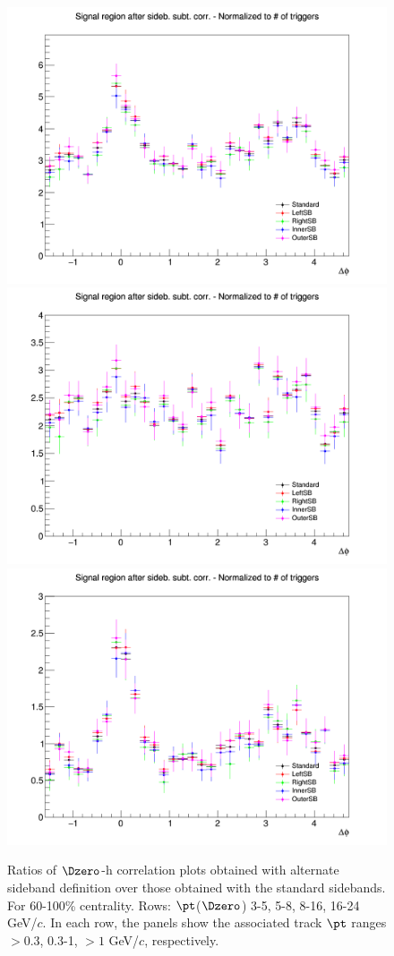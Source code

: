 \begin{figure}
{\includegraphics[width=0.31\linewidth]{figuresVsCent/Dzero/SystSideb/60100/AzimCorrDistr_Dzero_Canvas_PtIntBins9to11_PoolInt_thr03to99_Superimp.png}}
{\includegraphics[width=0.31\linewidth]{figuresVsCent/Dzero/SystSideb/60100/AzimCorrDistr_Dzero_Canvas_PtIntBins9to11_PoolInt_thr03to1_Superimp.png}}
{\includegraphics[width=0.31\linewidth]{figuresVsCent/Dzero/SystSideb/60100/AzimCorrDistr_Dzero_Canvas_PtIntBins9to11_PoolInt_thr1to99_Superimp.png}}  \\
 \caption{Ratios of $\Dzero$-h correlation plots obtained with alternate sideband definition over those obtained with the standard sidebands. For 60-100\% centrality. Rows: $\pt$($\Dzero$) 3-5, 5-8, 8-16, 16-24 GeV/$c$. In each row, the panels show the associated track $\pt$ ranges $> 0.3$, 0.3-1, $> 1$ GeV/$c$, respectively.}
\label{fig:SysBkg60100}
\end{figure}

